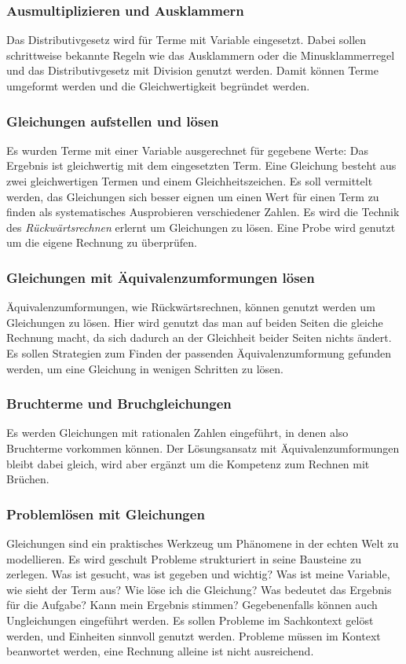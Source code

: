 \documentclass{article}
\begin{document}
\subsubsection*{Ausmultiplizieren und Ausklammern}
Das Distributivgesetz wird für Terme mit Variable eingesetzt. Dabei sollen schrittweise bekannte Regeln wie das Ausklammern oder die Minusklammerregel und das Distributivgesetz mit Division genutzt werden.
Damit können Terme umgeformt werden und die Gleichwertigkeit begründet werden.
\subsubsection*{Gleichungen aufstellen und lösen}
Es wurden Terme mit einer Variable ausgerechnet für gegebene Werte: Das Ergebnis ist gleichwertig mit dem eingesetzten Term. 
Eine Gleichung besteht aus zwei gleichwertigen Termen und einem Gleichheitszeichen.
Es soll vermittelt werden, das Gleichungen sich besser eignen um einen Wert für einen Term zu finden als systematisches Ausprobieren verschiedener Zahlen.
Es wird die Technik des \textit{Rückwärtsrechnen} erlernt um Gleichungen zu lösen. Eine Probe wird genutzt um die eigene Rechnung zu überprüfen.

\subsubsection*{Gleichungen mit Äquivalenzumformungen lösen}
Äquivalenzumformungen, wie Rückwärtsrechnen, können genutzt werden um Gleichungen zu lösen.
Hier wird genutzt das man auf beiden Seiten die gleiche Rechnung macht, da sich dadurch an der Gleichheit beider Seiten nichts ändert.
Es sollen Strategien zum Finden der passenden Äquivalenzumformung gefunden werden, um eine Gleichung in wenigen Schritten zu lösen.
\subsubsection*{Bruchterme und Bruchgleichungen}
Es werden Gleichungen mit rationalen Zahlen eingeführt, in denen also Bruchterme vorkommen können.
Der Lösungsansatz mit Äquivalenzumformungen bleibt dabei gleich, wird aber ergänzt um die Kompetenz zum Rechnen mit Brüchen.
\subsubsection*{Problemlösen mit Gleichungen}
Gleichungen sind ein praktisches Werkzeug um Phänomene in der echten Welt zu modellieren.
Es wird geschult Probleme strukturiert in seine Bausteine zu zerlegen. Was ist gesucht, was ist gegeben und wichtig? Was ist meine Variable, wie sieht der Term aus? Wie löse ich die Gleichung? Was bedeutet das Ergebnis für die Aufgabe? Kann mein Ergebnis stimmen?
Gegebenenfalls können auch Ungleichungen eingeführt werden. Es sollen Probleme im Sachkontext gelöst werden, und Einheiten sinnvoll genutzt werden.
Probleme müssen im Kontext beanwortet werden, eine Rechnung alleine ist nicht ausreichend.
\end{document}
